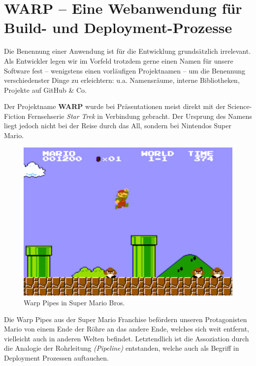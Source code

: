 
\chapter{WARP – Eine Webanwendung für Build- und Deployment-Prozesse}

Die Benennung einer Anwendung ist für die Entwicklung grundsätzlich irrelevant. Als Entwickler legen wir im Vorfeld trotzdem gerne einen Namen für unsere Software fest – wenigstens einen vorläufigen Projektnamen – um die Benennung verschiedenster Dinge zu erleichtern: u.a. Namensräume, interne Bibliotheken, Projekte auf GitHub \& Co.

Der Projektname \textbf{WARP} wurde bei Präsentationen meist direkt mit der Science-Fiction Fernsehserie \emph{Star Trek} in Verbindung gebracht. Der Ursprung des Namens liegt jedoch nicht bei der Reise durch das All, sondern bei Nintendos Super Mario.

\begin{figure}[h]
  \caption{Warp Pipes in Super Mario Bros.}
  \label{fig:super-mario-warp-pipes}
  \centering
    \includegraphics[width=.5\textwidth]{assets/mario-pipes}
\end{figure}

Die Warp Pipes aus der Super Mario Franchise befördern unseren Pro\-ta\-go\-nisten Mario von einem Ende der Röhre an das andere Ende, welches sich weit entfernt, vielleicht auch in anderen Welten befindet. Letztendlich ist die Assoziation durch die Analogie der Rohrleitung \emph{(Pipeline)} entstanden, welche auch als Begriff in Deployment Prozessen auftauchen.

